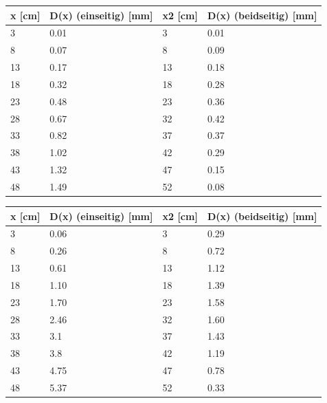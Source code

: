 \begin{minipage}{\linewidth}
    \begin{table}[H]
        \centering
    \begin{tabular}{llll}
        \toprule
        x [cm] & D(x) (einseitig) [mm] & x2 [cm] & D(x) (beidseitig) [mm] \\
        \midrule
        3  & 0.01 & 3  & 0.01 \\ 
        8  & 0.07 & 8  & 0.09 \\ 
        13 & 0.17 & 13 & 0.18 \\ 
        18 & 0.32 & 18 & 0.28 \\ 
        23 & 0.48 & 23 & 0.36 \\ 
        28 & 0.67 & 32 & 0.42 \\ 
        33 & 0.82 & 37 & 0.37 \\ 
        38 & 1.02 & 42 & 0.29 \\ 
        43 & 1.32 & 47 & 0.15 \\ 
        48 & 1.49 & 52 & 0.08 \\ 
        \bottomrule   
    \end{tabular}
    
    \label{tab:3}
\end{table}
\end{minipage}

\begin{minipage}{\linewidth}
    \begin{table}[H]
        \centering
    \begin{tabular}{llll}
        \toprule
        x [cm] & D(x) (einseitig) [mm] & x2 [cm] & D(x) (beidseitig) [mm] \\
        \midrule
        3  & 0.06 & 3  & 0.29 \\ 
        8  & 0.26 & 8  & 0.72 \\ 
        13 & 0.61 & 13 & 1.12 \\ 
        18 & 1.10 & 18 & 1.39 \\ 
        23 & 1.70 & 23 & 1.58 \\ 
        28 & 2.46 & 32 & 1.60 \\ 
        33 & 3.1  & 37 & 1.43 \\ 
        38 & 3.8  & 42 & 1.19 \\ 
        43 & 4.75 & 47 & 0.78 \\ 
        48 & 5.37 & 52 & 0.33 \\ 
        \bottomrule   
    \end{tabular}
    
    \label{tab:4}
\end{table}
\end{minipage}